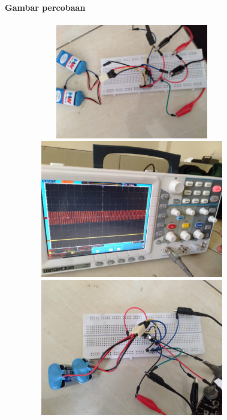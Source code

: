 \documentclass[12pt,a4paper]{article}
\begin{document}
\newpage
\begin{figure}
\paragraph{Gambar percobaan}
\paragraph{ }
\begin{center}

\includegraphics[width=12cm, height=5cm]{Adder1.png}

\includegraphics[width=12cm, height=6cm]{Adder2.png}

\includegraphics[width=12cm, height=6cm]{Diferent1.png}
\end{center}
\end{figure}
\vspace{2cm}
\end{document}
